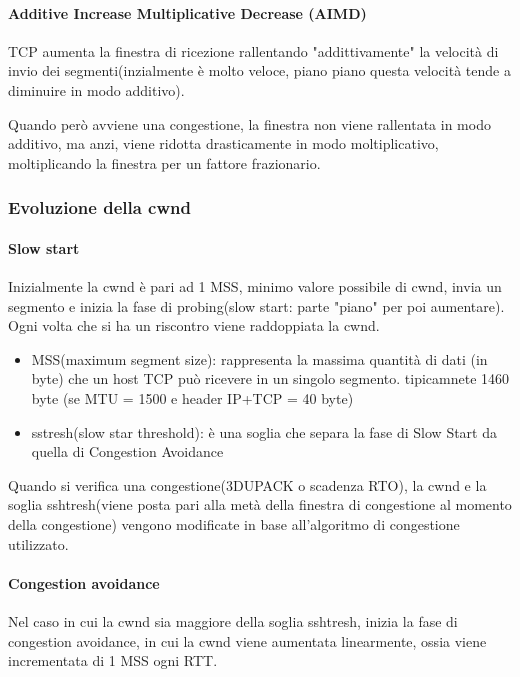 \paragraph{Additive Increase Multiplicative Decrease (AIMD)}
TCP aumenta la finestra di ricezione rallentando "addittivamente" la velocità di invio dei segmenti(inzialmente è molto veloce, piano piano questa velocità tende a diminuire in modo additivo). 

Quando però avviene una congestione, la finestra non viene rallentata in modo additivo, ma anzi, viene ridotta drasticamente in modo moltiplicativo, moltiplicando la finestra per un fattore frazionario. 


\subsubsection{Evoluzione della cwnd}

        \paragraph{Slow start}
        Inizialmente la cwnd è pari ad 1 MSS, minimo valore possibile di cwnd, invia un segmento e inizia la fase di probing(slow start: parte "piano" per poi aumentare). Ogni volta che si ha un riscontro viene raddoppiata la cwnd. 

        \begin{itemize}
            \item MSS(maximum segment size): rappresenta la massima quantità di dati (in byte) che un host TCP può ricevere in un singolo segmento.
            tipicamnete 1460 byte (se MTU = 1500 e header IP+TCP = 40 byte)
            \item sstresh(slow star threshold): è una soglia che separa la fase di Slow Start da quella di Congestion Avoidance
        \end{itemize}

        Quando si verifica una congestione(3DUPACK o scadenza RTO), la cwnd e la soglia sshtresh(viene posta pari alla metà della finestra di congestione al momento della congestione) vengono modificate in base all'algoritmo di congestione utilizzato.

        \paragraph{Congestion avoidance}
        Nel caso in cui  la cwnd sia maggiore della soglia sshtresh, inizia la fase di congestion avoidance, in cui la cwnd viene aumentata linearmente, ossia viene incrementata di 1 MSS ogni RTT.

